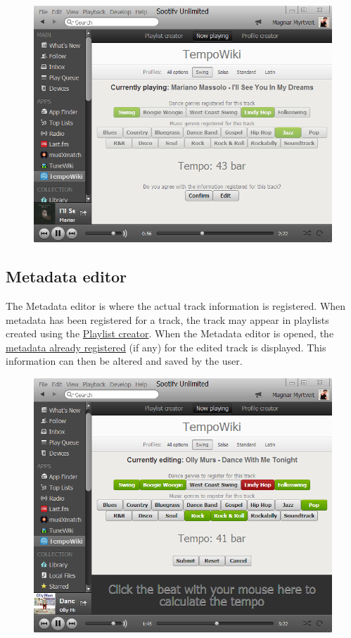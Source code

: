 \documentclass[a4paper, 12pt]{article}
\begin{document}
\begin{figure}[placement h]
\includegraphics{img/now-playing.png}
\end{figure}

\subsection{Metadata editor}
\label{sec:editor}
The Metadata editor is where the actual track information is registered. When metadata has been registered for a track, the track may appear in playlists created using the \hyperref[sec:playlist]{Playlist creator}. When the Metadata editor is opened, the \hyperref[sec:fetching]{metadata already registered} (if any) for the edited track is displayed. This information can then be altered and saved by the user.

\begin{figure}[placement h]
\includegraphics{img/metadata-editor.png}
\end{figure}
\end{document}

